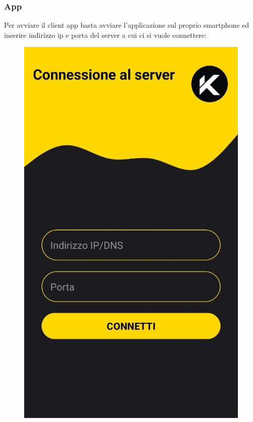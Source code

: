\subsubsection{App}
\noindent Per avviare il client app basta avviare l'applicazione sul proprio smartphone ed inserire indirizzo ip e porta del server a cui ci si vuole connettere:
\begin{figure}[H]
  \centering
  \includegraphics[scale=0.25]{img/app1.png}
\end{figure}
